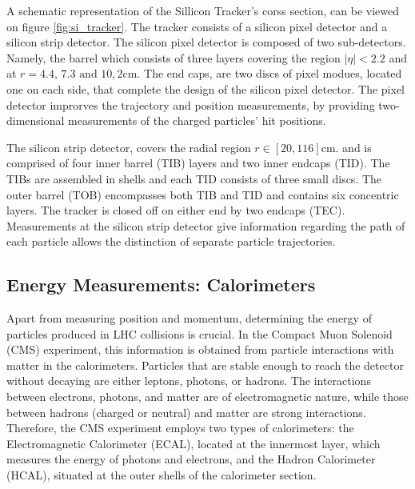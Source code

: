 A schematic representation of the Sillicon Tracker's corss section, can be viewed on figure \ref{fig:si_tracker}\cite{Chatrchyan:1129810}. The tracker consists of a silicon pixel detector and a silicon strip detector. The silicon pixel detector is composed of two sub-detectors. Namely, the barrel which consists of three layers covering the region \(|\eta| < 2.2\) and at \(r = 4.4\text{, }7.3\text{ and }10,2\text{cm}\). The end caps, are two discs of pixel modues, located one on each side, that complete the design of the silicon pixel detector. The pixel detector improrves the trajectory and position measurements, by providing two-dimensional measurements of the charged particles' hit positions.

The silicon strip detector, covers the radial region \(r \in \left[ 20, 116 \right]\text{cm}\). and  is comprised of four inner barrel (TIB) layers and two inner endcaps (TID). The TIBs are assembled in shells and each TID consists of three small discs. The outer barrel (TOB) encompasses both TIB and TID and contains six concentric layers. The tracker is closed off on either end by two endcaps (TEC). Measurements at the silicon strip detector give information regarding the path of each particle allows the distinction of separate particle trajectories.

\subsection{Energy Measurements: Calorimeters}
\label{sec:orgeca8eed}
Apart from measuring position and momentum, determining the energy of particles produced in LHC collisions is crucial. In the Compact Muon Solenoid (CMS) experiment, this information is obtained from particle interactions with matter in the calorimeters. Particles that are stable enough to reach the detector without decaying are either leptons, photons, or hadrons. The interactions between electrons, photons, and matter are of electromagnetic nature, while those between hadrons (charged or neutral) and matter are strong interactions. Therefore, the CMS experiment employs two types of calorimeters: the Electromagnetic Calorimeter (ECAL), located at the innermost layer, which measures the energy of photons and electrons, and the Hadron Calorimeter (HCAL), situated at the outer shells of the calorimeter section.

